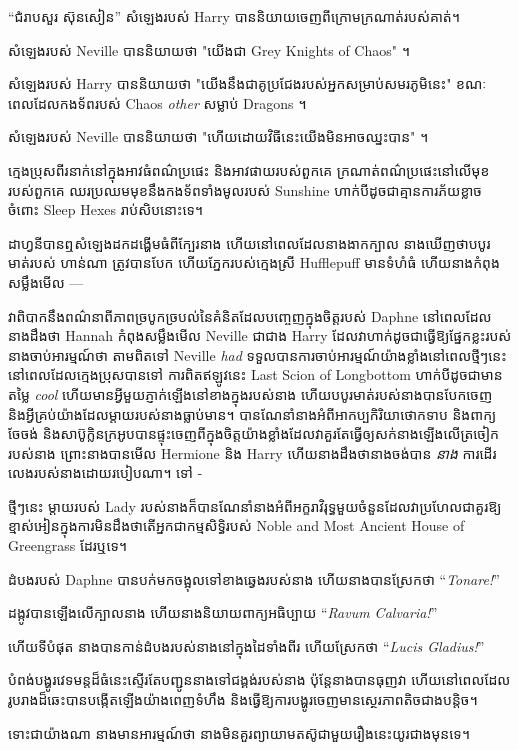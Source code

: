 “ជំរាបសួរ ស៊ុនសៀន” សំឡេងរបស់ Harry បាននិយាយចេញពីក្រោមក្រណាត់របស់គាត់។

សំឡេងរបស់ Neville បាននិយាយថា "យើងជា Grey Knights of Chaos" ។

សំឡេងរបស់ Harry បាននិយាយថា "យើងនឹងជាគូប្រជែងរបស់អ្នកសម្រាប់សមរភូមិនេះ" ខណៈពេលដែលកងទ័ពរបស់ Chaos \emph{other} សម្លាប់ Dragons ។

សំឡេងរបស់ Neville បាននិយាយថា "ហើយដោយវិធីនេះយើងមិនអាចឈ្នះបាន" ។

\later

ក្មេងប្រុសពីរនាក់នៅក្នុងអាវធំពណ៌ប្រផេះ និងអាវផាយរបស់ពួកគេ ក្រណាត់ពណ៌ប្រផេះនៅលើមុខរបស់ពួកគេ ឈរប្រឈមមុខនឹងកងទ័ពទាំងមូលរបស់ Sunshine ហាក់បីដូចជាគ្មានការភ័យខ្លាចចំពោះ Sleep Hexes រាប់សិបនោះទេ។

ដាហ្វនីបានឮសំឡេងដកដង្ហើមធំពីក្បែរនាង ហើយនៅពេលដែលនាងងាកក្បាល នាងឃើញថាបបូរមាត់របស់ ហាន់ណា ត្រូវបានបែក ហើយភ្នែករបស់ក្មេងស្រី Hufflepuff មានទំហំធំ ហើយនាងកំពុងសម្លឹងមើល —

វាពិបាកនឹងពណ៌នាពីភាពច្របូកច្របល់នៃគំនិតដែលបញ្ចេញក្នុងចិត្តរបស់ Daphne នៅពេលដែលនាងដឹងថា Hannah កំពុងសម្លឹងមើល Neville ជាជាង Harry ដែលវាហាក់ដូចជាធ្វើឱ្យផ្នែកខ្លះរបស់នាងចាប់អារម្មណ៍ថា តាមពិតទៅ Neville \emph {had} ទទួលបានការចាប់អារម្មណ៍យ៉ាងខ្លាំងនៅពេលថ្មីៗនេះ នៅពេលដែលក្មេងប្រុសបានទៅ ការពិតឥឡូវនេះ Last Scion of Longbottom ហាក់បីដូចជាមានតម្លៃ \emph{cool} ហើយមានអ្វីមួយភ្ញាក់ឡើងនៅខាងក្នុងរបស់នាង ហើយបបូរមាត់របស់នាងបានបែកចេញ និងអ្វីគ្រប់យ៉ាងដែលម្តាយរបស់នាងធ្លាប់មាន។ បាន​ណែនាំ​នាង​អំពី​អាកប្បកិរិយា​ថោកទាប និង​ពាក្យ​ចែចង់ និង​សាប៊ូ​ក្លិន​ក្រអូប​បាន​ផ្ទុះ​ចេញ​ពី​ក្នុង​ចិត្ត​យ៉ាង​ខ្លាំង​ដែល​វា​គួរ​តែ​ធ្វើ​ឲ្យ​សក់​នាង​ឡើង​លើ​ត្រចៀក​របស់​នាង ព្រោះ​នាង​បាន​មើល Hermione និង Harry ហើយ​នាង​ដឹង​ថា​នាង​ចង់​បាន \emph{នាង} ការ​ដើរ​លេង​របស់​នាង​ដោយ​របៀប​ណា។ ទៅ -

ថ្មីៗនេះ ម្តាយរបស់ Lady របស់នាងក៏បានណែនាំនាងអំពីអក្ខរាវិរុទ្ធមួយចំនួនដែលវាប្រហែលជាគួរឱ្យខ្មាស់អៀនក្នុងការមិនដឹងថាតើអ្នកជាកម្មសិទ្ធិរបស់ Noble and Most Ancient House of Greengrass ដែរឬទេ។

ដំបងរបស់ Daphne បានបក់មកចង្អុលទៅខាងឆ្វេងរបស់នាង ហើយនាងបានស្រែកថា “\emph{Tonare!}”

ដង្កូវ​បាន​ឡើង​លើ​ក្បាល​នាង ហើយ​នាង​និយាយ​ពាក្យ​អធិប្បាយ “\emph{Ravum Calvaria!}”

ហើយទីបំផុត នាងបានកាន់ដំបងរបស់នាងនៅក្នុងដៃទាំងពីរ ហើយស្រែកថា “\emph{Lucis Gladius!}”

បំពង់បង្ហូរវេទមន្តដ៏ធំនេះស្ទើរតែបញ្ជូននាងទៅជង្គង់របស់នាង ប៉ុន្តែនាងបានធុញវា ហើយនៅពេលដែលរូបរាងដ៏ឆេះបានបង្កើតឡើងយ៉ាងពេញទំហឹង និងធ្វើឱ្យការបង្ហូរចេញមានស្ថេរភាពតិចជាងបន្តិច។

ទោះ​ជា​យ៉ាង​ណា នាង​មាន​អារម្មណ៍​ថា នាង​មិន​គួរ​ព្យាយាម​តស៊ូ​ជាមួយ​រឿង​នេះ​យូរ​ជាង​មុន​ទេ។

